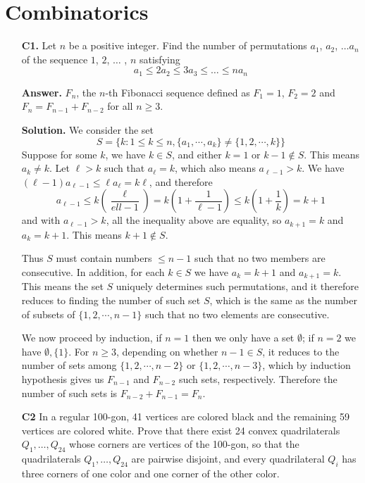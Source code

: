 \documentclass[11pt,a4paper]{article}
\begin{document}
\section*{Combinatorics}
\begin{enumerate}
	\item [\textbf{C1.}] Let $n$ be a positive integer. Find the number of permutations $a_1$, $a_2$, $\dots a_n$ of the
	sequence $1$, $2$, $\dots$ , $n$ satisfying
	$$a_1 \le 2a_2\le 3a_3 \le \dots \le na_n$$
	
	\textbf{Answer.} $F_n$, the $n$-th Fibonacci sequence defined as $F_1=1$, $F_2=2$ and $F_n=F_{n-1}+F_{n-2}$ for all $n\ge 3$. 
	
	\textbf{Solution.} We consider the set 
	\[
	S=\{k: 1\le k\le n, \{a_1, \cdots , a_k\}\neq \{1, 2, \cdots, k\}\}
	\]
	Suppose for some $k$, we have $k\in S$, and either $k=1$ or $k-1\not\in S$. This means $a_k\neq k$. Let $\ell>k$ such that $a_{\ell}=k$, which also means $a_{\ell-1}>k$. We have $(\ell-1)a_{\ell-1}\le \ell a_{\ell}=k\ell$, and therefore 
	\[
	a_{\ell-1}\le k(\frac{\ell}{ell-1})=k(1+\frac{1}{\ell-1})\le k(1+\frac{1}{k})=k+1
	\]
	and with $a_{\ell-1}>k$, all the inequality above are equality, so $a_{k+1}=k$ and $a_k=k+1$. This means $k+1\not\in S$. 
	
	Thus $S$ must contain numbers $\le n-1$ such that no two members are consecutive. In addition, for each $k\in S$ we have $a_k=k+1$ and $a_{k+1}=k$. This means the set $S$ uniquely determines such permutations, and it therefore reduces to finding the number of such set $S$, which is the same as the number of subsets of $\{1, 2, \cdots, n-1\}$ such that no two elements are consecutive. 
	
	We now proceed by induction, if $n=1$ then we only have a set $\emptyset$; if $n=2$ we have $\emptyset, \{1\}$. For $n\ge 3$, depending on whether $n-1\in S$, it reduces to the number of sets among $\{1, 2, \cdots , n-2\}$ or $\{1, 2, \cdots , n-3\}$, which by induction hypothesis gives us $F_{n-1}$ and $F_{n-2}$ such sets, respectively. 
	Therefore the number of such sets is $F_{n-2}+F_{n-1}=F_n$. 
	
	\item[\textbf{C2}] In a regular 100-gon, 41 vertices are colored black and the remaining 59 vertices are colored white. Prove that there exist 24 convex quadrilaterals $Q_{1}, \ldots, Q_{24}$ whose corners are vertices of the 100-gon, so that
	the quadrilaterals $Q_{1}, \ldots, Q_{24}$ are pairwise disjoint, and
	every quadrilateral $Q_{i}$ has three corners of one color and one corner of the other color.
	

\end{enumerate}
\end{document}
